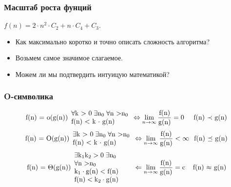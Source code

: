 \documentclass[russian, 12pt]{beamer}
\begin{document}
\begin{frame}
\frametitle{Масштаб роста фунций}
$f(n) = 2\cdot n^2 \cdot C_2 + n \cdot C_4 + C_3.$\\[0.3cm]
\begin{itemize}
  \pause
  \item Как максимально коротко и точно описать сложность алгоритма?\\[0.3cm]
  \pause
  \item Возьмем самое значимое слагаемое.\\[0.3cm]
  \pause
  \item Можем ли мы подтвердить интуицую математикой?
\end{itemize}
\end{frame}
\begin{frame}
\frametitle{O-символика}
\begin{equation*}
\text{f(n) = o(g(n))}
  \begin{array}{l}
  \forall\text{k > 0}\;\exists\text{n}_0\;  \forall \text{n >}\text{n}_0  \\
  \text{f(n) < k $\cdot$ g(n)}
  \end{array}
\Leftrightarrow
\lim_{n\rightarrow\infty}\frac{\text{f(n)}}{\text{g(n)}}=\text{0}
\hspace{0.49cm}
\text{f(n) $\prec$ g(n)}
\end{equation*}
\vspace{0.3cm}
\begin{equation*}
\text{f(n) = O(g(n))}
  \begin{array}{l}
    \exists\text{k > 0}\;\exists\text{n}_0\;  \forall \text{n >}\text{n}_0  \\
    \text{f(n) < k $\cdot$ g(n)}
  \end{array}
\Leftrightarrow
\lim_{n\rightarrow\infty}\frac{\text{f(n)}}{\text{g(n)}}<\infty
\hspace{0.25cm}
\text{f(n) $\preceq$ g(n)}
\end{equation*}
\vspace{0.3cm}
\begin{equation*}
\text{f(n) = $\Theta$(g(n))}
  \begin{array}{l}
    \exists\text{k}_1\text{k}_2 >\text{0}\;\exists\text{n}_0\hspace{0.5cm}\\
    \forall \text{n >}\text{n}_0\\
    \text{k}_1 \cdot \text{g(n)} < \text{f(n)}\\
    \text{f(n)} < \text{k}_2 \cdot \text{g(n)}
  \end{array}
\hspace{0.2cm}
\Leftarrow
\lim_{n\rightarrow\infty}\frac{\text{f(n)}}{\text{g(n)}}=\text{c}
\hspace{0.4cm}
\text{f(n) $\approx$ g(n)}
\end{equation*}
\end{frame}
\end{document}
